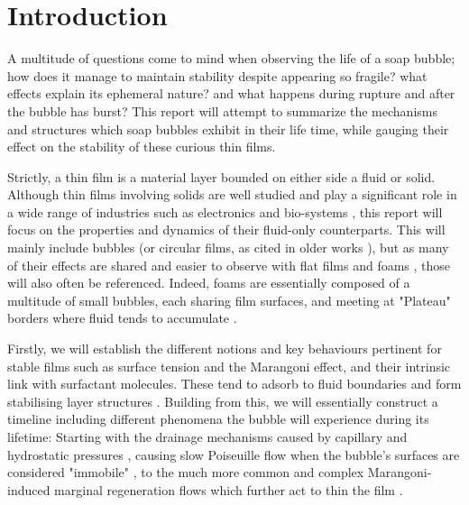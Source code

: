 \documentclass[a4paper,12pt]{article}
\numberwithin{equation}{section}
\numberwithin{figure}{section}
\numberwithin{table}{section}
\begin{document}
\newpage
\tableofcontents


\newpage
\clearpage{}
\section{Introduction}

A multitude of questions come to mind when observing the life of a soap bubble; how does it manage to maintain stability despite appearing so fragile? what effects explain its ephemeral nature? and what happens during rupture and after the bubble has burst? This report will attempt to summarize the mechanisms and structures which soap bubbles exhibit in their life time, while gauging their effect on the stability of these curious thin films.

Strictly, a thin film is a material layer bounded on either side a fluid or solid. Although thin films involving solids are well studied and play a significant role in a wide range of industries such as electronics and bio-systems \cite{SolidThinFilms}, this report will focus on the properties and dynamics of their fluid-only counterparts. This will mainly include bubbles (or circular films, as cited in older works \cite{Vrij1968, VrijDiscussion1966}), but as many of their effects are shared and easier to observe with flat films and foams \cite{Braun2002}, those will also often be referenced. Indeed, foams are essentially composed of a multitude of small bubbles, each sharing film surfaces, and meeting at "Plateau" borders where fluid tends to accumulate \cite{Almgren1976}. %

Firstly, we will establish the different notions and key behaviours pertinent for stable films such as surface tension and the Marangoni effect, and their intrinsic link with surfactant molecules. These tend to adsorb to fluid boundaries \cite{Gast1997} and form stabilising layer structures \cite{Mysels1968Nomenclature}. Building from this, we will essentially construct a timeline including different phenomena the bubble will experience during its lifetime: Starting with the drainage mechanisms caused by capillary and hydrostatic pressures \cite{Lhuissier2011}, causing slow Poiseuille flow when the bubble's surfaces are considered "immobile" \cite{Nierstrasz1999, Bruinsma1995, Modini2013}, to the much more common and complex Marangoni-induced marginal regeneration flows which further act to thin the film \cite{Mysels1959Book, Bhamla2017, Bruinsma1995}.
\end{document}
